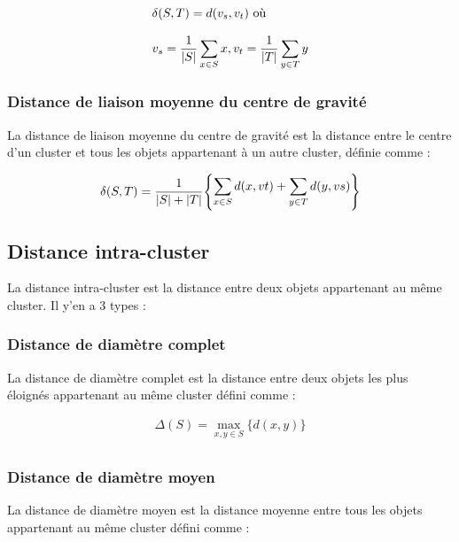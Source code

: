 \begin{equation}
	\begin{tabular}{@{}l@{}}
		\(\displaystyle \delta (S,T) = d(v_{s}, v_{t} ) \) où \\ \\
		\(\displaystyle v_{s} = \frac{1}{\left\lvert S \right\rvert}  \sum_{x \in S} x,v_{t} = \frac{1}{\left\lvert T \right\rvert} \sum_{y \in T}y  \) 
	\end{tabular} 
\end{equation}

\subsubsection{Distance de liaison moyenne du centre de gravité}
La distance de liaison moyenne du centre de gravité est la distance entre le centre d'un cluster et tous les objets appartenant à un autre cluster, définie comme :

\begin{equation}
	\delta (S,T) = \frac{1}{\left\lvert S \right\rvert  + \left\lvert T \right\rvert  }  \Bigg\{
\begin{tabular}{@{}l@{}}
   \(\displaystyle \sum_{x \in S} d(x,vt) + \sum_{y \in T}d(y,vs) \)
\end{tabular} \Bigg\}
\end{equation}

\subsection{Distance intra-cluster}
La distance intra-cluster est la distance entre deux objets appartenant au même cluster. Il y’en a 3 types :

\subsubsection{Distance de diamètre complet}
La distance de diamètre complet est la distance entre deux objets les plus éloignés appartenant au même cluster défini comme :

\begin{equation}
	\begin{split}
		\Delta (S) = \max_{x,y \in S} \{ d(x,y) \}  \\
	\end{split}
\end{equation}

\subsubsection{Distance de diamètre moyen}
La distance de diamètre moyen est la distance moyenne entre tous les objets appartenant au même cluster défini comme :

